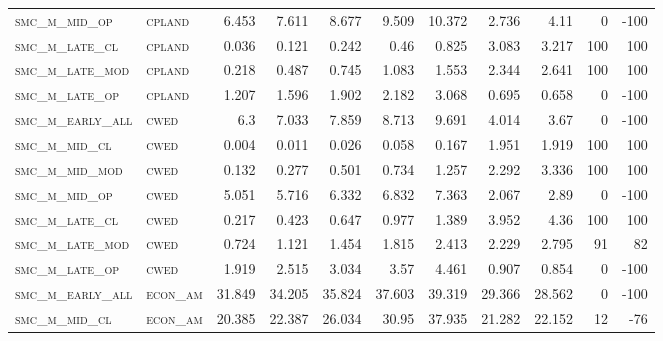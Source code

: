 \begin{landscape}
\begin{center}
\begin{footnotesize}
\begin{longtable}{llrrrrrr|rrr}
\textsc{smc\_m\_mid\_op   } & \textsc{cpland    }   & 6.453    & 7.611    & 8.677    & 9.509    & 10.372   & 2.736       & 4.11          & 0             & -100     \\
\textsc{smc\_m\_late\_cl  } & \textsc{cpland    }   & 0.036    & 0.121    & 0.242    & 0.46     & 0.825    & 3.083       & 3.217         & 100           & 100      \\
\textsc{smc\_m\_late\_mod } & \textsc{cpland    }   & 0.218    & 0.487    & 0.745    & 1.083    & 1.553    & 2.344       & 2.641         & 100           & 100      \\
\textsc{smc\_m\_late\_op  } & \textsc{cpland    }   & 1.207    & 1.596    & 1.902    & 2.182    & 3.068    & 0.695       & 0.658         & 0             & -100     \\
\textsc{smc\_m\_early\_all} & \textsc{cwed      }   & 6.3      & 7.033    & 7.859    & 8.713    & 9.691    & 4.014       & 3.67          & 0             & -100     \\
\textsc{smc\_m\_mid\_cl   } & \textsc{cwed      }   & 0.004    & 0.011    & 0.026    & 0.058    & 0.167    & 1.951       & 1.919         & 100           & 100      \\
\textsc{smc\_m\_mid\_mod  } & \textsc{cwed      }   & 0.132    & 0.277    & 0.501    & 0.734    & 1.257    & 2.292       & 3.336         & 100           & 100      \\
\textsc{smc\_m\_mid\_op   } & \textsc{cwed      }   & 5.051    & 5.716    & 6.332    & 6.832    & 7.363    & 2.067       & 2.89          & 0             & -100     \\
\textsc{smc\_m\_late\_cl  } & \textsc{cwed      }   & 0.217    & 0.423    & 0.647    & 0.977    & 1.389    & 3.952       & 4.36          & 100           & 100      \\
\textsc{smc\_m\_late\_mod } & \textsc{cwed      }   & 0.724    & 1.121    & 1.454    & 1.815    & 2.413    & 2.229       & 2.795         & 91            & 82       \\
\textsc{smc\_m\_late\_op  } & \textsc{cwed      }   & 1.919    & 2.515    & 3.034    & 3.57     & 4.461    & 0.907       & 0.854         & 0             & -100     \\
\textsc{smc\_m\_early\_all} & \textsc{econ\_am  }   & 31.849   & 34.205   & 35.824   & 37.603   & 39.319   & 29.366      & 28.562        & 0             & -100     \\
\textsc{smc\_m\_mid\_cl   } & \textsc{econ\_am  }   & 20.385   & 22.387   & 26.034   & 30.95    & 37.935   & 21.282      & 22.152        & 12            & -76      \\

\end{longtable}
\end{footnotesize}
\end{center}
\end{landscape}
